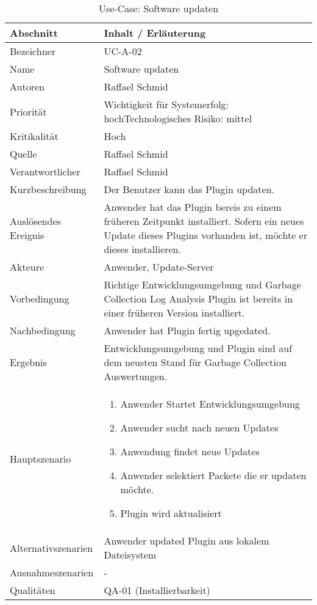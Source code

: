 \begin{longtable}{|p{4cm}|p{10.5cm}|}
\caption{Use-Case: Software updaten}\\\hline
   \textbf{Abschnitt} & \textbf{Inhalt / Erläuterung} \\\hline
   Bezeichner & UC-A-02\\\hline
   Name & Software updaten\\\hline
   Autoren & Raffael Schmid\\\hline
   Priorität & Wichtigkeit für Systemerfolg: hoch\newline Technologisches Risiko: mittel\\\hline
   Kritikalität & Hoch\\\hline
   Quelle & Raffael Schmid\\\hline
   Verantwortlicher & Raffael Schmid\\\hline
   Kurzbeschreibung & Der Benutzer kann das Plugin updaten.\\\hline
   Auslösendes Ereignis & Anwender hat das Plugin bereis zu einem früheren Zeitpunkt installiert. Sofern ein neues Update dieses Plugins vorhanden ist, möchte er dieses installieren.\\\hline
   Akteure & Anwender, Update-Server\\\hline
   Vorbedingung & Richtige Entwicklungsumgebung und Garbage Collection Log Analysis Plugin ist bereits in einer früheren Version installiert.\\\hline
   Nachbedingung & Anwender hat Plugin fertig upgedated.\\\hline
   Ergebnis & Entwicklungsumgebung und Plugin sind auf dem neusten Stand für Garbage Collection Auswertungen.\\\hline
   Hauptszenario & 
	\begin{enumerate}
		\item Anwender Startet Entwicklungsumgebung
		\item Anwender sucht nach neuen Updates
		\item Anwendung findet neue Updates
		\item Anwender selektiert Packete die er updaten möchte.
		\item Plugin wird aktualisiert
	\end{enumerate}
	\\\hline
   Alternativszenarien & Anwender updated Plugin aus lokalem Dateisystem\\\hline
   Ausnahmeszenarien & -\\\hline
   Qualitäten & QA-01 (Installierbarkeit)\\\hline
\end{longtable}

